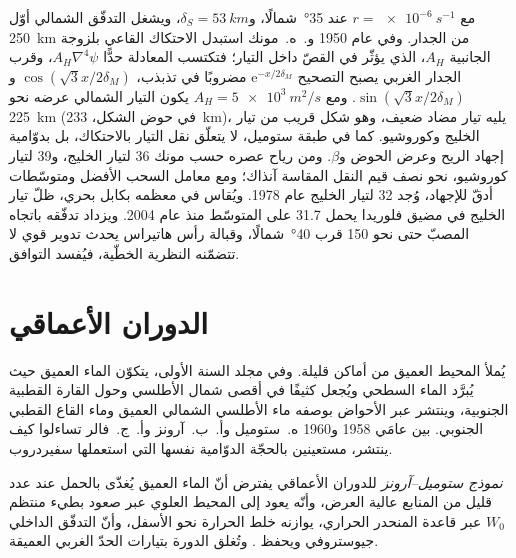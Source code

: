 مع $r = \qty{e-6}{s^{-1}}$ عند \ang{35}~شمالًا، و$\delta_S = \qty{53}{km}$،
ويشغل التدفّق الشمالي أوّل \qty{250}{km} من الجدار. وفي عام 1950
و.~ه.~مونك استبدل الاحتكاك القاعي بلزوجة  الجانبية $A_H$،
الذي يؤثّر في القصّ داخل التيار؛ فتكتسب المعادلة حدًّا
$A_H\nabla^4\psi$، وقرب الجدار الغربي يصبح التصحيح
$\mathrm e^{-x/2\delta_M}$ مضروبًا في تذبذب، $\cos(\sqrt3x/2\delta_M)$
و$\sin(\sqrt3x/2\delta_M)$. ومع $A_H = \qty{5e3}{m^2/s}$ يكون التيار الشمالي
عرضه نحو \qty{225}{km} (في حوض الشكل، \qty{233}{km})،
يليه تيار مضاد ضعيف، وهو شكل قريب من تيار الخليج
وكوروشيو. كما في طبقة ستوميل، لا يتعلّق نقل التيار
بالاحتكاك، بل بدوّامية إجهاد الريح وعرض
الحوض و$\beta$. ومن رياح عصره حسب مونك
\qty{36}{\sverdrup} لتيار الخليج، و\qty{39}{\sverdrup} لتيار
كوروشيو، نحو نصف قيم النقل المقاسة آنذاك؛ ومع معامل
السحب الأفضل ومتوسّطات أدقّ للإجهاد، وُجد \qty{32}{\sverdrup}
لتيار الخليج عام 1978. ويُقاس في معظمه بكابل بحري،
ظلّ تيار الخليج في مضيق فلوريدا يحمل \qty{31.7}{\sverdrup} على
المتوسّط منذ عام 2004. ويزداد تدفّقه باتجاه المصبّ حتى نحو \qty{150}{\sverdrup} قرب
\ang{40}~شمالًا، وقبالة رأس هاتيراس يحدث تدوير قوي
لا تتضمّنه النظرية الخطّية، فيُفسد التوافق.

\section{الدوران الأعماقي}\label{sec:b3:ocean-dynamics:abyssal}

يُملأ المحيط العميق من أماكن قليلة. وفي مجلد السنة الأولى، يتكوّن الماء العميق
حيث يُبرَّد الماء السطحي ويُجعل كثيفًا في أقصى شمال
الأطلسي وحول القارة القطبية الجنوبية، وينتشر عبر الأحواض بوصفه ماء الأطلسي الشمالي
العميق وماء القاع القطبي الجنوبي. بين عامَي 1958 و1960
ه.~ستوميل وأ.~ب.~آرونز وأ.~ج.~فالر تساءلوا كيف ينتشر، مستعينين
بالحجّة الدوّامية نفسها التي استعملها سفيردروب.

\begin{definition}\label{def:b3:ocean-dynamics:abyssal}
\emph{نموذج ستوميل--آرونز} للدوران الأعماقي يفترض أنّ
الماء العميق يُغذّى بالحمل عند عدد قليل من
المنابع عالية العرض، وأنّه يعود إلى المحيط العلوي عبر صعود بطيء منتظم
$W_0$ عبر قاعدة المنحدر الحراري، يوازنه خلط الحرارة نحو الأسفل، وأنّ
التدفّق الداخلي جيوستروفي ويحفظ
. وتُغلق الدورة بتيارات الحدّ الغربي
العميقة.
\end{definition}

